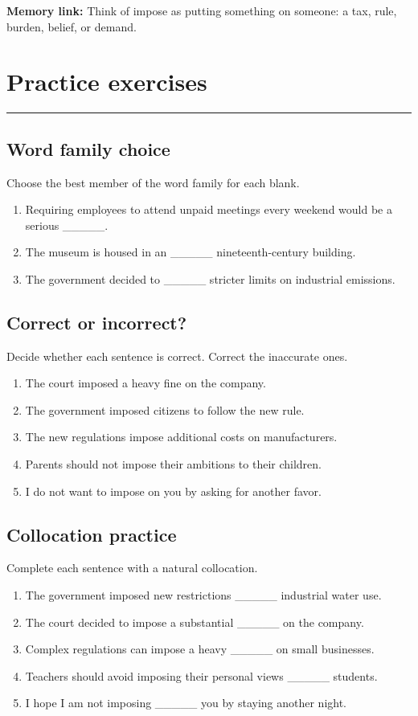 \documentclass[11pt]{article}
\newcommand{\sectionrule}{\par\vspace{-0.5em}\noindent\textcolor{Accent}{\rule{\linewidth}{0.6pt}}\par}
\begin{document}
\textbf{Memory link:} Think of impose as putting something on someone: a tax, rule, burden, belief, or demand.

\section{Practice exercises}
\sectionrule
\subsection{Word family choice}
Choose the best member of the word family for each blank.

\begin{enumerate}
  \item Requiring employees to attend unpaid meetings every weekend would be a serious \_\_\_\_\_.
  \item The museum is housed in an \_\_\_\_\_ nineteenth-century building.
  \item The government decided to \_\_\_\_\_ stricter limits on industrial emissions.
\end{enumerate}

\subsection{Correct or incorrect?}
Decide whether each sentence is correct. Correct the inaccurate ones.

\begin{enumerate}
  \item The court imposed a heavy fine on the company.
  \item The government imposed citizens to follow the new rule.
  \item The new regulations impose additional costs on manufacturers.
  \item Parents should not impose their ambitions to their children.
  \item I do not want to impose on you by asking for another favor.
\end{enumerate}

\subsection{Collocation practice}
Complete each sentence with a natural collocation.

\begin{enumerate}
  \item The government imposed new restrictions \_\_\_\_\_ industrial water use.
  \item The court decided to impose a substantial \_\_\_\_\_ on the company.
  \item Complex regulations can impose a heavy \_\_\_\_\_ on small businesses.
  \item Teachers should avoid imposing their personal views \_\_\_\_\_ students.
  \item I hope I am not imposing \_\_\_\_\_ you by staying another night.
\end{enumerate}
\end{document}
